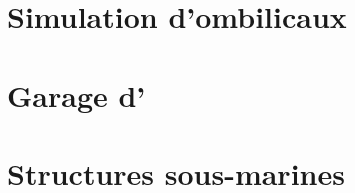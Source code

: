 		\section{Simulation d'ombilicaux}

			

		\section{Garage d'\argos{}}

		\section{Structures sous-marines}
		